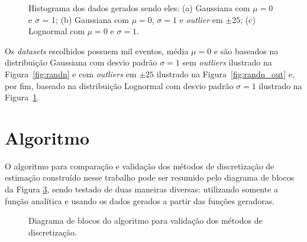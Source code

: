 \begin{figure}[H]
\begin{subfigure}[b]{0.27\textwidth}
	\caption{}
	\label{fig:randlog}
\end{subfigure}

\caption{Histograma dos dados gerados sendo eles: (a) Gaussiana com $\mu = 0$ e $\sigma$ = 1; (b) Gaussiana com $\mu = 0$, $\sigma = 1$ e \textit{outlier} em $\pm 25$; (c) Lognormal com $\mu = 0$ e $\sigma = 1$.}
\label{fig:data}
\end{figure}

Os \textit{datasets} escolhidos possuem mil eventos, média $ \mu = 0 $ e são baseados na distribuição Gaussiana com desvio padrão $ \sigma = 1 $ sem \textit{outliers} ilustrado na Figura~\ref{fig:randn} e com \textit{outliers} em $ \pm 25 $ ilustrado  na Figura~\ref{fig:randn_out} e, por fim, baseado na distribuição Lognormal com desvio padrão $ \sigma = 1 $ ilustrado na Figura~\ref{fig:randlog}.



\section{Algoritmo}

O algoritmo para comparação e validação dos métodos de discretização de estimação construído nesse trabalho pode ser resumido pelo diagrama de blocos da Figura \ref{fig:08}, sendo testado de duas maneiras diversas: utilizando somente a função analítica e usando os dados gerados a partir das funções geradoras.

\begin{figure}[H]
	\begin{center}
		\caption{Diagrama de blocos do algoritmo para validação dos métodos de discretização.}\label{fig:08}
	\end{center}
\end{figure}


